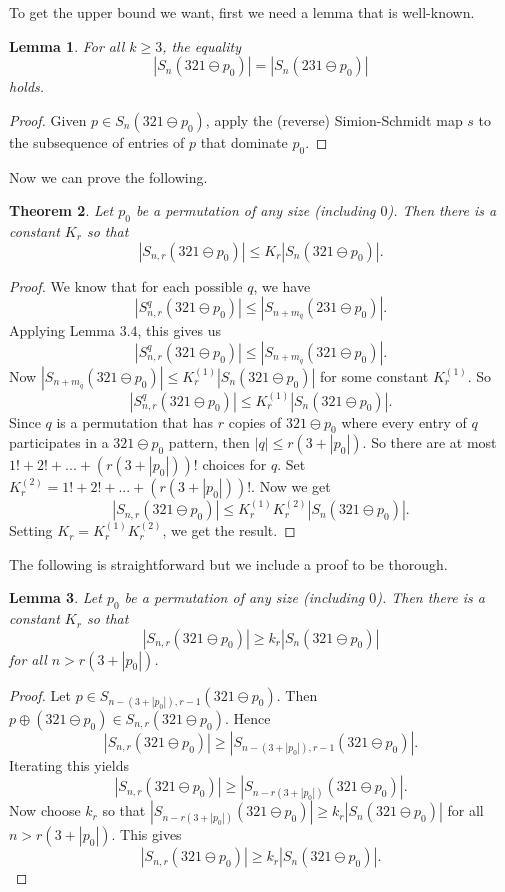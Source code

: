 \documentclass[11pt]{amsart}
\newtheorem{theorem}{Theorem}[section]								\newtheorem{proposition}[theorem]{Proposition}
\newtheorem{lemma}[theorem]{Lemma}
\theoremstyle{remark}
\numberwithin{equation}{section}
\begin{document}
\vspace{10pt}
To get the upper bound we want, first we need a lemma that is well-known.
\begin{lemma}
    For all $k\geq 3$, the equality
    \[
    |S_n(321 \ominus p_0)| = |S_n(231 \ominus p_0)|
    \]
    holds.
\end{lemma}
\begin{proof}
    Given $p \in S_n(321 \ominus p_0)$, apply the (reverse) Simion-Schmidt map $s$ to the subsequence of entries of $p$ that dominate $p_0$.
\end{proof}
Now we can prove the following.
\begin{theorem}
    Let $p_0$ be a permutation of any size (including $0$). Then there is a constant $K_r$ so that 
    \[
    |S_{n,r}(321\ominus p_0)| \leq K_r |S_{n}(321\ominus p_0)|.
    \]
\end{theorem}
\begin{proof}
    We know that for each possible $q$, we have
    \[
    |S^q_{n,r}(321\ominus p_0)| \leq |S_{n + m_{\overline{q}}}(231\ominus p_0)|.
    \]
    Applying Lemma $3.4$, this gives us 
    \[
    |S^q_{n,r}(321\ominus p_0)| \leq |S_{n + m_{\overline{q}}}(321\ominus p_0)|.
    \]
    Now $|S_{n + m_{\overline{q}}}(321\ominus p_0)| \leq K^{(1)}_r |S_{n}(321\ominus p_0)| $ for some constant $K^{(1)}_r$. So
    \[
    |S^q_{n,r}(321\ominus p_0)| \leq K^{(1)}_r |S_{n}(321\ominus p_0)|.
    \]
    Since $q$ is a permutation that has $r$ copies of $321\ominus p_0$ where every entry of $q$ participates in a $321\ominus p_0$ pattern, then $|q| \leq r(3 + |p_0|)$. So there are at most $1! + 2! + ... + (r(3 + |p_0|))!$ choices for $q$. Set $K^{(2)}_r = 1! + 2! + ... + (r(3 + |p_0|))!$. Now we get
    \[
    |S_{n,r}(321\ominus p_0)| \leq K^{(1)}_r K^{(2)}_r |S_{n}(321\ominus p_0)|.
    \]
    Setting $K_r = K^{(1)}_r K^{(2)}_r$, we get the result.
\end{proof}

\vspace{10pt}
The following is straightforward but we include a proof to be thorough.
\begin{lemma}
    Let $p_0$ be a permutation of any size (including $0$). Then there is a constant $K_r$ so that 
    \[
    |S_{n,r}(321\ominus p_0)| \geq k_r |S_{n}(321\ominus p_0)|
    \]
    for all $n> r(3 + |p_0|)$.
\end{lemma}
\begin{proof}
    Let $p\in S_{n-(3 + |p_0|),r-1}(321 \ominus p_0)$. Then $p\oplus (321 \ominus p_0) \in S_{n,r}(321\ominus p_0)$. Hence
    \[
    |S_{n,r}(321\ominus p_0)| \geq |S_{n-(3 + |p_0|),r-1}(321 \ominus p_0)|.
    \]
    Iterating this yields
    \[
    |S_{n,r}(321\ominus p_0)| \geq |S_{n-r(3 + |p_0|)}(321 \ominus p_0)|.
    \]
    Now choose $k_r$ so that $|S_{n-r(3 + |p_0|)}(321 \ominus p_0)| \geq k_r|S_{n}(321 \ominus p_0)|$ for all $n > r(3 + |p_0|)$. This gives
    \[
    |S_{n,r}(321\ominus p_0)| \geq k_r |S_{n}(321\ominus p_0)|.
    \]
\end{proof}
\end{document}
